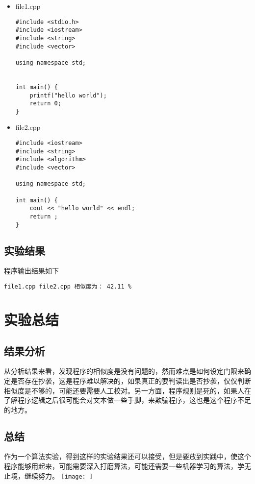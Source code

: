 \documentclass[UTF8]{ctexart}
\begin{document}
\begin{itemize} 
\item file1.cpp
\lstset{language=c++,
	frame=shadowbox}
\begin{lstlisting}
#include <stdio.h>
#include <iostream>
#include <string>
#include <vector>

using namespace std;


int main() {
	printf("hello world");
	return 0;
}

\end{lstlisting}

\item file2.cpp
\lstset{language=c++,
frame=shadowbox}
\begin{lstlisting} 
#include <iostream>
#include <string>
#include <algorithm>
#include <vector>

using namespace std;

int main() {
	cout << "hello world" << endl;
	return ;
}

\end{lstlisting}
\end{itemize}


\subsection{实验结果}
程序输出结果如下
\begin{lstlisting}
file1.cpp file2.cpp 相似度为： 42.11 %
\end{lstlisting}

\section{实验总结}

\subsection{结果分析}
从分析结果来看，发现程序的相似度是没有问题的，然而难点是如何设定门限来确定是否存在抄袭，这是程序难以解决的，如果真正的要判读出是否抄袭，仅仅判断相似度是不够的，可能还要需要人工校对。另一方面，程序规则是死的，如果人在了解程序逻辑之后很可能会对文本做一些手脚，来欺骗程序，这也是这个程序不足的地方。
\subsection{总结}
作为一个算法实验，得到这样的实验结果还可以接受，但是要放到实践中，使这个程序能够用起来，可能需要深入打磨算法，可能还需要一些机器学习的算法，学无止境，继续努力。
\texttt{[image: ]}
\end{document}
